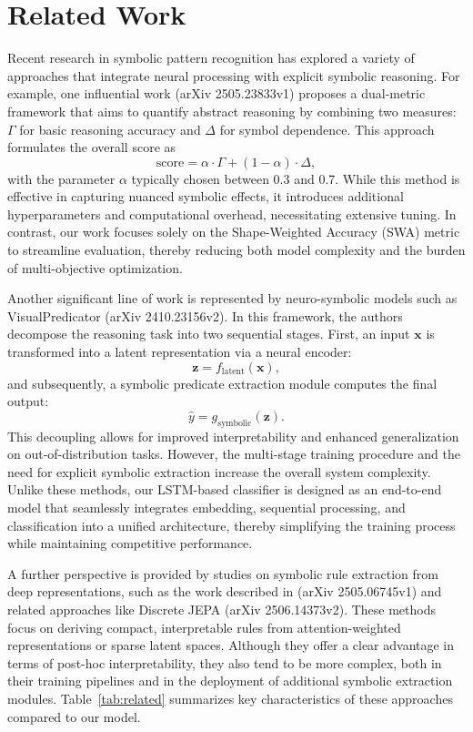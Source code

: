 \documentclass{article}
\begin{document}
\section{Related Work}
Recent research in symbolic pattern recognition has explored a variety of approaches that integrate neural processing with explicit symbolic reasoning. For example, one influential work (arXiv 2505.23833v1) proposes a dual-metric framework that aims to quantify abstract reasoning by combining two measures: \(\Gamma\) for basic reasoning accuracy and \(\Delta\) for symbol dependence. This approach formulates the overall score as
\[
\mathrm{score} = \alpha \cdot \Gamma + (1-\alpha) \cdot \Delta,
\]
with the parameter \(\alpha\) typically chosen between 0.3 and 0.7. While this method is effective in capturing nuanced symbolic effects, it introduces additional hyperparameters and computational overhead, necessitating extensive tuning. In contrast, our work focuses solely on the Shape-Weighted Accuracy (SWA) metric to streamline evaluation, thereby reducing both model complexity and the burden of multi-objective optimization.

Another significant line of work is represented by neuro-symbolic models such as VisualPredicator (arXiv 2410.23156v2). In this framework, the authors decompose the reasoning task into two sequential stages. First, an input \(\mathbf{x}\) is transformed into a latent representation via a neural encoder:
\[
\mathbf{z} = f_{\text{latent}}(\mathbf{x}),
\]
and subsequently, a symbolic predicate extraction module computes the final output:
\[
\hat{y} = g_{\text{symbolic}}(\mathbf{z}).
\]
This decoupling allows for improved interpretability and enhanced generalization on out-of-distribution tasks. However, the multi-stage training procedure and the need for explicit symbolic extraction increase the overall system complexity. Unlike these methods, our LSTM-based classifier is designed as an end-to-end model that seamlessly integrates embedding, sequential processing, and classification into a unified architecture, thereby simplifying the training process while maintaining competitive performance.

A further perspective is provided by studies on symbolic rule extraction from deep representations, such as the work described in (arXiv 2505.06745v1) and related approaches like Discrete JEPA (arXiv 2506.14373v2). These methods focus on deriving compact, interpretable rules from attention-weighted representations or sparse latent spaces. Although they offer a clear advantage in terms of post-hoc interpretability, they also tend to be more complex, both in their training pipelines and in the deployment of additional symbolic extraction modules. Table~\ref{tab:related} summarizes key characteristics of these approaches compared to our model.
\end{document}
